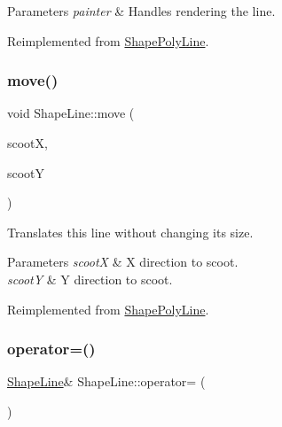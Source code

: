 \begin{DoxyParams}{Parameters}
{\em painter} & Handles rendering the line. \\
\hline
\end{DoxyParams}


Reimplemented from \mbox{\hyperlink{class_shape_poly_line_a6aaca4bd2767644f9ea0f68065fa1f98}{Shape\+Poly\+Line}}.

\mbox{\label{class_shape_line_a5b6d9bcf7ed64ab2454d5efa66486ee9}} 
\subsubsection{\texorpdfstring{move()}{move()}}
{\footnotesize\ttfamily void Shape\+Line\+::move (\begin{DoxyParamCaption}\item[{int}]{scootX,  }\item[{int}]{scootY }\end{DoxyParamCaption})\hspace{0.3cm}{\ttfamily [virtual]}}



Translates this line without changing its size. 


\begin{DoxyParams}{Parameters}
{\em scootX} & X direction to scoot. \\
\hline
{\em scootY} & Y direction to scoot. \\
\hline
\end{DoxyParams}


Reimplemented from \mbox{\hyperlink{class_shape_poly_line_a7c1971596b171c4c08ec5657b6592354}{Shape\+Poly\+Line}}.

\mbox{\label{class_shape_line_a4c9674af8f603496953ba824ba70dfc7}} 
\subsubsection{\texorpdfstring{operator=()}{operator=()}}
{\footnotesize\ttfamily \mbox{\hyperlink{class_shape_line}{Shape\+Line}}\& Shape\+Line\+::operator= (\begin{DoxyParamCaption}\item[{const \mbox{\hyperlink{class_shape_line}{Shape\+Line}} \&}]{ }\end{DoxyParamCaption})\hspace{0.3cm}{\ttfamily [delete]}}



